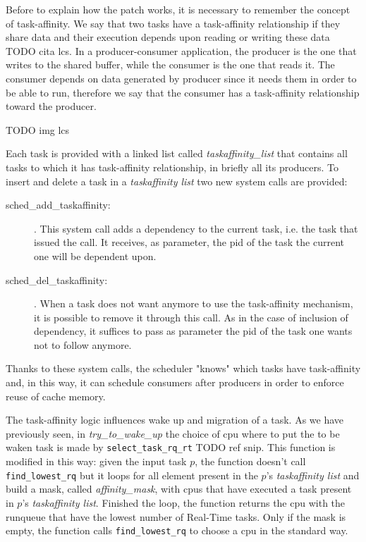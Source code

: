 Before to explain how the patch works, it is necessary to remember the concept of task-affinity. We say that two tasks have a task-affinity relationship if 
they share data and their execution depends upon reading or writing these data TODO cita lcs. In a producer-consumer application, the producer 
is the one that writes to the shared buffer, while the consumer is the one that reads it. The consumer depends on data generated by producer since it needs 
them in order to be able to run, therefore we say that the consumer has a task-affinity relationship toward the producer.

TODO img lcs

Each task is provided with a linked list called \textit{taskaffinity\_list} that contains all tasks to which it has task-affinity relationship, in briefly 
all its producers. To insert and delete a task in a \textit{taskaffinity list} two new system calls are provided:

\begin{description}

\item[sched\_add\_taskaffinity:]. This system call adds a dependency to the current task, i.e. the task that issued the call. It receives, as parameter, the 
pid of the task the current one will be dependent upon.

\item[sched\_del\_taskaffinity:]. When a task does not want anymore to use the task-affinity mechanism, it is possible to remove it through this call.
As in the case of inclusion of dependency, it suffices to pass as parameter the pid of the task one wants not to follow anymore.

\end{description}

Thanks to these system calls, the scheduler "knows" which tasks have task-affinity and, in this way, it can schedule consumers after producers in order to 
enforce reuse of cache memory.

The task-affinity logic influences wake up and migration of a task. As we have previously seen, in \textit{try\_to\_wake\_up} the choice of cpu where to 
put the to be waken task is made by \texttt{select\_task\_rq\_rt} TODO ref snip. This function is modified in this way: given the input task $p$, the 
function doesn't call \texttt{find\_lowest\_rq} but it loops for all element present in the $p$'s \textit{taskaffinity list} and build a mask, called 
\textit{affinity\_mask}, with cpus that have executed a task present in $p$'s \textit{taskaffinity list}. Finished the loop, the function returns the cpu 
with the runqueue that have the lowest number of Real-Time tasks. Only if the mask is empty, the function calls \texttt{find\_lowest\_rq} to choose a cpu
in the standard way. 

